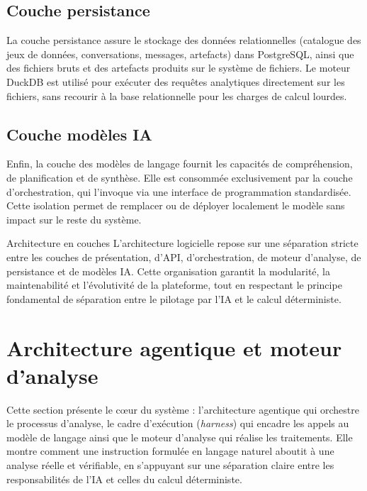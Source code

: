 \subsection{Couche persistance}

La couche persistance assure le stockage des données relationnelles (catalogue des jeux de données, conversations, messages, artefacts) dans PostgreSQL, ainsi que des fichiers bruts et des artefacts produits sur le système de fichiers. Le moteur DuckDB est utilisé pour exécuter des requêtes analytiques directement sur les fichiers, sans recourir à la base relationnelle pour les charges de calcul lourdes.

\subsection{Couche modèles IA}

Enfin, la couche des modèles de langage fournit les capacités de compréhension, de planification et de synthèse. Elle est consommée exclusivement par la couche d'orchestration, qui l'invoque via une interface de programmation standardisée. Cette isolation permet de remplacer ou de déployer localement le modèle sans impact sur le reste du système.

\begin{resultbox}{Architecture en couches}
L'architecture logicielle repose sur une séparation stricte entre les couches de présentation, d'API, d'orchestration, de moteur d'analyse, de persistance et de modèles IA. Cette organisation garantit la modularité, la maintenabilité et l'évolutivité de la plateforme, tout en respectant le principe fondamental de séparation entre le pilotage par l'IA et le calcul déterministe.
\end{resultbox}

\section{Architecture agentique et moteur d'analyse}

Cette section présente le cœur du système : l'architecture agentique qui orchestre le processus d'analyse, le cadre d'exécution (\textit{harness}) qui encadre les appels au modèle de langage ainsi que le moteur d'analyse qui réalise les traitements. Elle montre comment une instruction formulée en langage naturel aboutit à une analyse réelle et vérifiable, en s'appuyant sur une séparation claire entre les responsabilités de l'IA et celles du calcul déterministe.

